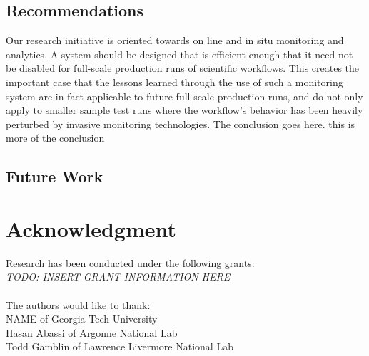 \documentclass[12pt, conference, compsocconf]{IEEEtran}
\begin{document}
\subsection{Recommendations}
Our research initiative is oriented towards on line and in 
situ monitoring and  analytics. A system should be designed that is efficient 
enough that it need not 
be disabled for full-scale production runs of scientific workflows. This creates 
the important case that the lessons learned through the use of such a 
monitoring system are in fact applicable to future full-scale production runs, 
and do not only apply to smaller sample test runs where the workflow's behavior 
has been heavily perturbed by invasive monitoring technologies.
The conclusion goes here. this is more of the conclusion
\subsection{Future Work}

\section*{Acknowledgment}
Research has been conducted under the following grants:\\
\textit{TODO: INSERT GRANT INFORMATION HERE}\\
\\
The authors would like to thank:\\
NAME of Georgia Tech University\\
Hasan Abassi of Argonne National Lab\\
Todd Gamblin of Lawrence Livermore National Lab


\end{document}
